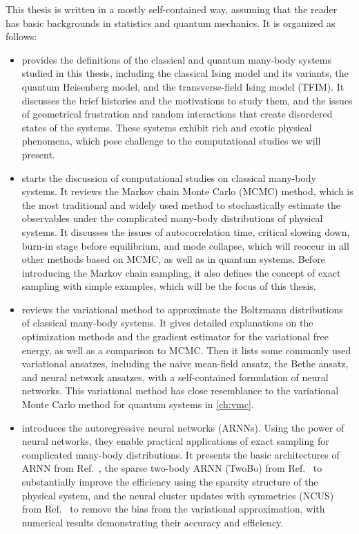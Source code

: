 This thesis is written in a mostly self-contained way, assuming that the reader has basic backgrounds in statistics and quantum mechanics. It is organized as follows:
\begin{itemize}
\item {} provides the definitions of the classical and quantum many-body systems studied in this thesis, including the classical Ising model and its variants, the quantum Heisenberg model, and the transverse-field Ising model (TFIM).
It discusses the brief histories and the motivations to study them, and the issues of geometrical frustration and random interactions that create disordered states of the systems. These systems exhibit rich and exotic physical phenomena, which pose challenge to the computational studies we will present.
\item {} starts the discussion of computational studies on classical many-body systems. It reviews the Markov chain Monte Carlo (MCMC) method, which is the most traditional and widely used method to stochastically estimate the observables under the complicated many-body distributions of physical systems.
It discusses the issues of autocorrelation time, critical slowing down, burn-in stage before equilibrium, and mode collapse, which will reoccur in all other methods based on MCMC, as well as in quantum systems.
Before introducing the Markov chain sampling, it also defines the concept of exact sampling with simple examples, which will be the focus of this thesis.
\item {} reviews the variational method to approximate the Boltzmann distributions of classical many-body systems.
It gives detailed explanations on the optimization methods and the gradient estimator for the variational free energy, as well as a comparison to MCMC.
Then it lists some commonly used variational ansatzes, including the naive mean-field ansatz, the Bethe ansatz, and neural network ansatzes, with a self-contained formulation of neural networks.
This variational method has close resemblance to the variational Monte Carlo method for quantum systems in \cref{ch:vmc}.
\item {} introduces the autoregressive neural networks (ARNNs). Using the power of neural networks, they enable practical applications of exact sampling for complicated many-body distributions.
It presents the basic architectures of ARNN from Ref.~\cite{wu2019solving}, the sparse two-body ARNN (TwoBo) from Ref.~\cite{biazzo2024sparse} to substantially improve the efficiency using the sparsity structure of the physical system, and the neural cluster updates with symmetries (NCUS) from Ref.~\cite{wu2021unbiased} to remove the bias from the variational approximation, with numerical results demonstrating their accuracy and efficiency.

\end{itemize}
